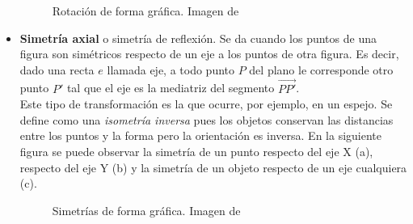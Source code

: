 \documentclass[a4paper, openright, 11pt, titlepage]{report}
\theoremstyle{definition}\newtheorem{defin}[propo]{Definition}
\theoremstyle{definition}\newtheorem{obser}[propo]{Remark}
\theoremstyle{definition}\newtheorem{ejem}[propo]{Ejemplo}
\theoremstyle{definition}\newtheorem{algoritmo}[propo]{Algoritmo}
\begin{document}
\begin{itemize}
\begin{figure}[H]
                \caption{Rotación de forma gráfica. Imagen de \cite{sangaku}}
        \end{figure}
    \item \textbf{Simetría axial} o simetría de reflexión. Se da cuando los puntos de una figura son simétricos respecto de un eje a los puntos de otra figura. Es decir, dado una recta $e$ llamada eje, a todo punto $P$ del plano le corresponde otro punto $P'$ tal que el eje es la mediatriz del segmento $\Vec{PP'}$.\\
    Este tipo de transformación es la que ocurre, por ejemplo, en un espejo. Se define como una \textit{isometría inversa} pues los objetos conservan las distancias entre los puntos y la forma pero la orientación es inversa. En la siguiente figura se puede observar la simetría de un punto respecto del eje X (a), respecto del eje Y (b) y la simetría de un objeto respecto de un eje cualquiera (c).
    \begin{figure}[H]
        \centering
         \hspace{0.5cm}
         \vspace{10mm}
        \caption{Simetrías de forma gráfica. Imagen de \cite{sangaku}}
        \end{figure}
\end{itemize}
\end{document}
